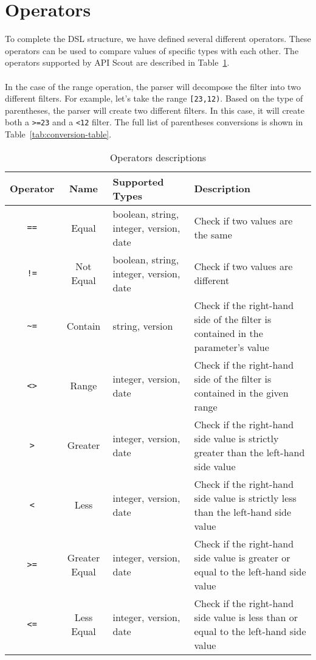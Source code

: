 \section{Operators}\label{sec:operators}
To complete the DSL structure, we have defined several different operators.
These operators can be used to compare values of specific types with each other.
The operators supported by API Scout are described in Table~\ref{tab:operators}. \\ \\
In the case of the range operation, the parser will decompose the filter into two different filters.
For example, let's take the range \verb|[23,12)|.
Based on the type of parentheses, the parser will create two different filters.
In this case, it will create both a \verb|>=23| and a \verb|<12| filter.
The full list of parentheses conversions is shown in Table~\ref{tab:conversion-table}.

\begin{table}[!h]
    \begin{center}
        \begin{tabular}{c c p{2.5cm} p{9cm}}
            \hline
            \textbf{Operator} & \textbf{Name} & \textbf{Supported Types} & \textbf{Description} \\ \hline
            \verb|==| & Equal & boolean, string, integer, version, date & Check if two values are the same \\
            \verb|!=| & Not Equal & boolean, string, integer, version, date & Check if two values are different \\
            \verb|~=| & Contain & string, version & Check if the right-hand side of the filter is contained in the parameter's value \\
            \verb|<>| & Range & integer, version, date & Check if the right-hand side of the filter is contained in the given range \\
            \verb|>| & Greater & integer, version, date & Check if the right-hand side value is strictly greater than the left-hand side value \\
            \verb|<| & Less & integer, version, date & Check if the right-hand side value is strictly less than the left-hand side value \\
            \verb|>=| & Greater Equal & integer, version, date & Check if the right-hand side value is greater or equal to the left-hand side value \\
            \verb|<=| & Less Equal & integer, version, date & Check if the right-hand side value is less than or equal to the left-hand side value \\ \hline
        \end{tabular}
    \end{center}

    \caption{Operators descriptions}
    \label{tab:operators}
\end{table}

